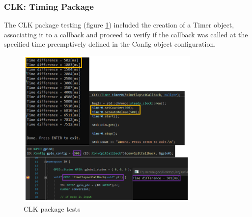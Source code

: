 \subsubsection{CLK: Timing Package}
%
The CLK package testing (figure \ref{fig:clk-test}) included the creation of a Timer object, associating it to a callback and proceed to verify if the callback was called at the specified time preemptively defined in the Config object configuration.
%
\begin{figure}[!ht]
\centering
\includegraphics[width=0.8\textwidth]{img/CLK-test.png}
\caption{\label{fig:clk-test}CLK package tests}
\end{figure}
%